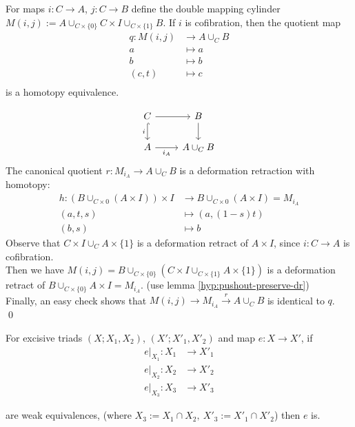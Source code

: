     \begin{lem}
        \label{hyp:double-mapping-cylinder-homotopy-pushout}
        For maps $i : C \to A$, $j : C \to B$
        define the double mapping cylinder
        $M(i,j) := A \cup_{C \times \{0\}} C \times I \cup_{C \times \{1\}} B$.
        If $i$ is cofibration,
        then the quotient map
        \begin{align*}
            q : M(i,j) & \to A \cup_C B\\
            a & \mapsto a\\
            b & \mapsto b\\
            (c,t) &  \mapsto c\\
        \end{align*}
        is a homotopy equivalence.
    \end{lem}

    \begin{prf}
        \[\begin{tikzcd}
            C & B \\
            A & {A \cup_C B}
            \arrow["i"', hook, from=1-1, to=2-1]
            \arrow[from=1-1, to=1-2]
            \arrow[from=1-2, to=2-2]
            \arrow["{i_A}"', from=2-1, to=2-2]
        \end{tikzcd}\]
        The canonical quotient $r : M_{i_A} \to A \cup_C B$ is a deformation retraction with homotopy:
        \begin{align*}
            h : (B \cup_{C \times 0} (A \times I)) \times I & \to B \cup_{C \times 0} (A \times I) = M_{i_A}\\
                (a,t,s) & \mapsto (a,(1-s)t)\\
                (b,s) & \mapsto b
        \end{align*}
        Observe that $C \times I \cup_C A \times \{1\}$ is a deformation retract of $A \times I$,
        since $i : C \to A$ is cofibration.\\
        Then we have $ M(i,j) =  B \cup_{C \times \{0\}}  (C \times I \cup_{C \times \{1\}} A \times \{1\})$
        is a deformation retract of $ B \cup_{C \times \{0\}} A\times I = M_{i_A}$.
        (use lemma \ref{hyp:pushout-preserve-dr})\\
        Finally, an easy check shows that $M(i,j) \to M_{i_A} \xrightarrow{r} A \cup_C B $
        is identical to $q$.\\
        \qed
    \end{prf}

    \begin{thm}
        \label{hyp:excisive-triads-weak-equivalence}
        For excisive triads $(X;X_1,X_2)$, $(X';X'_1,X'_2)$
        and map $e : X \to X'$,
        if
        \begin{align*}
            e|_{X_1} : X_1 & \to X'_1\\
            e|_{X_2} : X_2 & \to X'_2\\
            e|_{X_3} : X_3 & \to X'_3
        \end{align*}
        
        are weak equivalences, (where $X_3 := X_1 \cap X_2,\  X'_3 := X'_1 \cap X'_2$)
        then $e$ is.
    \end{thm}

